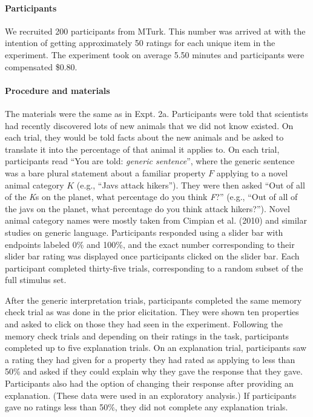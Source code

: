 \documentclass[floatsintext,doc]{apa6}
\theoremstyle{definition}
\theoremstyle{definition}
\theoremstyle{definition}
\theoremstyle{remark}
\begin{document}
\paragraph{Participants}\label{participants-3}

We recruited 200 participants from MTurk. This number was arrived at
with the intention of getting approximately 50 ratings for each unique
item in the experiment. The experiment took on average 5.50 minutes and
participants were compensated \$0.80.

\paragraph{Procedure and materials}\label{procedure-and-materials-3}

The materials were the same as in Expt. 2a. Participants were told that
scientists had recently discovered lots of new animals that we did not
know existed. On each trial, they would be told facts about the new
animals and be asked to translate it into the percentage of that animal
it applies to. On each trial, participants read \enquote{You are told:
\emph{generic sentence}}, where the generic sentence was a bare plural
statement about a familiar property \(F\) applying to a novel animal
category \(K\) (e.g., \enquote{Javs attack hikers}). They were then
asked \enquote{Out of all of the \emph{K}s on the planet, what
percentage do you think \emph{F}?} (e.g., \enquote{Out of all of the
javs on the planet, what percentage do you think attack hikers?}). Novel
animal category names were mostly taken from Cimpian et al. (2010) and
similar studies on generic language. Participants responded using a
slider bar with endpoints labeled 0\% and 100\%, and the exact number
corresponding to their slider bar rating was displayed once participants
clicked on the slider bar. Each participant completed thirty-five
trials, corresponding to a random subset of the full stimulus set.

After the generic interpretation trials, participants completed the same
memory check trial as was done in the prior elicitation. They were shown
ten properties and asked to click on those they had seen in the
experiment. Following the memory check trials and depending on their
ratings in the task, participants completed up to five explanation
trials. On an explanation trial, participants saw a rating they had
given for a property they had rated as applying to less than 50\% and
asked if they could explain why they gave the response that they gave.
Participants also had the option of changing their response after
providing an explanation. (These data were used in an exploratory
analysis.) If participants gave no ratings less than 50\%, they did not
complete any explanation trials.
\end{document}
